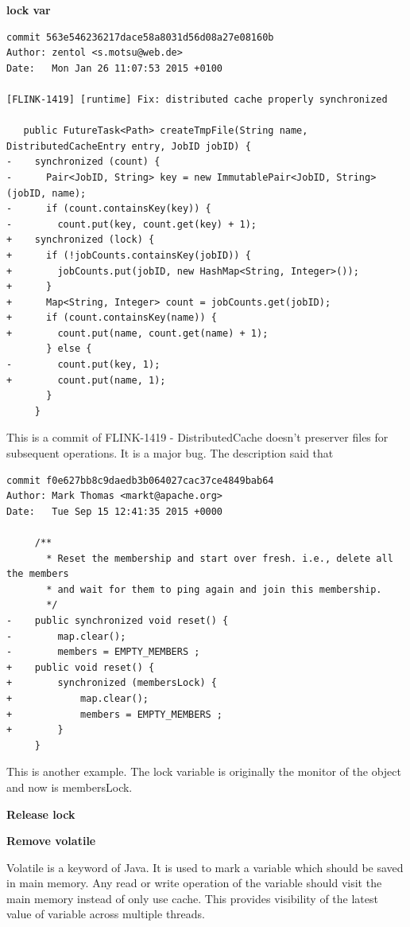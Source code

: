 \documentclass[conference]{IEEEtran}
\begin{document}
\textbf{lock var}
\begin{lstlisting}
commit 563e546236217dace58a8031d56d08a27e08160b
Author: zentol <s.motsu@web.de>
Date:   Mon Jan 26 11:07:53 2015 +0100

[FLINK-1419] [runtime] Fix: distributed cache properly synchronized

   public FutureTask<Path> createTmpFile(String name, DistributedCacheEntry entry, JobID jobID) {
-    synchronized (count) {
-      Pair<JobID, String> key = new ImmutablePair<JobID, String>(jobID, name);
-      if (count.containsKey(key)) {
-        count.put(key, count.get(key) + 1);
+    synchronized (lock) {
+      if (!jobCounts.containsKey(jobID)) {
+        jobCounts.put(jobID, new HashMap<String, Integer>());
+      }
+      Map<String, Integer> count = jobCounts.get(jobID);
+      if (count.containsKey(name)) {
+        count.put(name, count.get(name) + 1);
       } else {
-        count.put(key, 1);
+        count.put(name, 1);
       }
     }
\end{lstlisting}

This is a commit of FLINK-1419 - DistributedCache doesn't preserver files for subsequent operations. It is a major bug. The description said that 

\begin{lstlisting}
commit f0e627bb8c9daedb3b064027cac37ce4849bab64
Author: Mark Thomas <markt@apache.org>
Date:   Tue Sep 15 12:41:35 2015 +0000

     /**
       * Reset the membership and start over fresh. i.e., delete all the members
       * and wait for them to ping again and join this membership.
       */
-    public synchronized void reset() {
-        map.clear();
-        members = EMPTY_MEMBERS ;
+    public void reset() {
+        synchronized (membersLock) {
+            map.clear();
+            members = EMPTY_MEMBERS ;
+        }
     }
\end{lstlisting}

This is another example. The lock variable is originally the monitor of the object and now is membersLock.

\textbf{Release lock}

\textbf{Remove volatile}

Volatile is a keyword of Java. It is used to mark a variable which should be saved in main memory. Any read or write operation of the variable should visit the main memory instead of only use cache. This provides visibility of the latest value of variable across multiple threads. 
\end{document}
